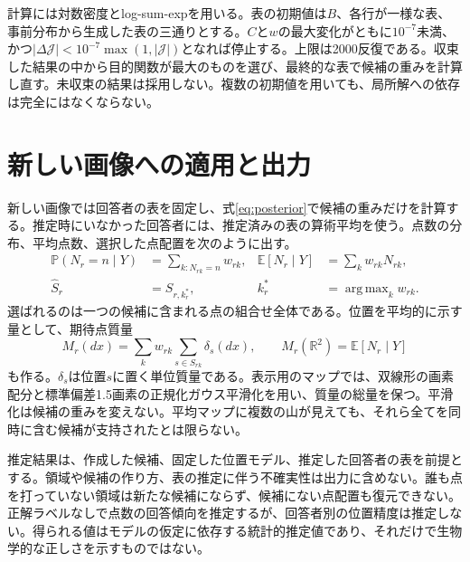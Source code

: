 \documentclass[a4paper,11pt]{article}
\newcommand{\Prob}{\mathbb{P}}
\newcommand{\E}{\mathbb{E}}
\newcommand{\R}{\mathbb{R}}
\DeclareMathOperator*{\argmax}{arg\,max}
\begin{document}
計算には対数密度とlog-sum-expを用いる。表の初期値は$B$、各行が一様な表、事前分布から生成した表の三通りとする。$C$と$w$の最大変化がともに$10^{-7}$未満、かつ$|\Delta\mathcal J|<10^{-7}\max(1,|\mathcal J|)$となれば停止する。上限は2000反復である。収束した結果の中から目的関数が最大のものを選び、最終的な表で候補の重みを計算し直す。未収束の結果は採用しない。複数の初期値を用いても、局所解への依存は完全にはなくならない。

\section*{新しい画像への適用と出力}

新しい画像では回答者の表を固定し、式\eqref{eq:posterior}で候補の重みだけを計算する。推定時にいなかった回答者には、推定済みの表の算術平均を使う。点数の分布、平均点数、選択した点配置を次のように出す。
\begin{align}
 \Prob(N_r=n\mid Y)&=\sum_{k:N_{rk}=n}w_{rk},
 &\E[N_r\mid Y]&=\sum_k w_{rk}N_{rk},
 \label{eq:count-output}\\
 \widehat S_r&=S_{r,k_r^*},
 &k_r^*&=\argmax_k w_{rk}.
 \label{eq:map-output}
\end{align}
選ばれるのは一つの候補に含まれる点の組合せ全体である。位置を平均的に示す量として、期待点質量
\begin{equation}
 M_r(dx)=\sum_k w_{rk}\sum_{s\in S_{rk}}\delta_s(dx),
 \qquad M_r(\R^2)=\E[N_r\mid Y]
 \label{eq:mass}
\end{equation}
も作る。$\delta_s$は位置$s$に置く単位質量である。表示用のマップでは、双線形の画素配分と標準偏差1.5画素の正規化ガウス平滑化を用い、質量の総量を保つ。平滑化は候補の重みを変えない。平均マップに複数の山が見えても、それら全てを同時に含む候補が支持されたとは限らない。

推定結果は、作成した候補、固定した位置モデル、推定した回答者の表を前提とする。領域や候補の作り方、表の推定に伴う不確実性は出力に含めない。誰も点を打っていない領域は新たな候補にならず、候補にない点配置も復元できない。正解ラベルなしで点数の回答傾向を推定するが、回答者別の位置精度は推定しない。得られる値はモデルの仮定に依存する統計的推定値であり、それだけで生物学的な正しさを示すものではない。
\end{document}
